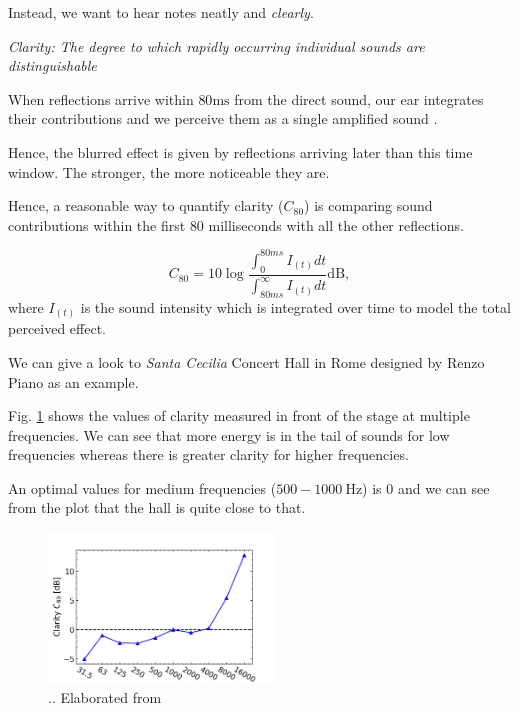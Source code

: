 \documentclass[a4paper]{article}
\begin{document}
Instead, we want to hear notes neatly and \textit{clearly}.
\\
\begin{tcolorbox}
\textit{Clarity: The degree to which rapidly occurring individual sounds are distinguishable \cite{book:acoustic3}}
\end{tcolorbox}\par\bigskip

When reflections arrive within $80 \mathrm{ms}$
from the direct sound, our ear integrates their contributions and we perceive them as a single amplified sound \cite{book:acoustic}.

Hence, the blurred effect is given by reflections arriving later than this time window. The stronger, the more noticeable they are. 

Hence, a reasonable way to quantify clarity ($C_{80}$) is comparing sound contributions within the first $80$ milliseconds with all the other reflections.

\begin{equation}
C_{80} = 10\log{\frac{\int_0^{80ms}{I_{(t)}dt}}{\int_{80ms}^{\infty}{I_{(t)} dt}}} \mathrm{dB},
\end{equation}
where $I_{(t)}$ is the sound intensity which is integrated over time to model the total perceived effect.

We can give a look to \textit{Santa Cecilia} Concert Hall in Rome designed by Renzo Piano as an example.

Fig. \ref{fig:clarity} shows the values of clarity measured in front of the stage at multiple frequencies. We can see that more energy is in the tail of sounds for low frequencies whereas there is greater clarity for higher frequencies.

An optimal values for medium frequencies ($500-1000\ \mathrm{Hz}$) is 0 \cite{article:santa_cecilia_acoustic} and we can see from the plot that the hall is quite close to that.

\begin{figure}
\centering
\begin{tcolorbox}

\includegraphics[width=6cm]{graph}
\caption{.. Elaborated from \cite{article:santa_cecilia_acoustic}}
\label{fig:clarity}

\end{tcolorbox}\par\bigskip
\end{figure}
\end{document}
